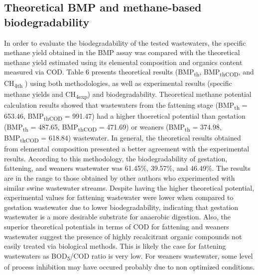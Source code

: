 \subsection{Theoretical BMP and methane-based biodegradability}
In order to evaluate the biodegradability of the tested wastewaters, the specific methane yield obtained in the BMP assay was compared with the theoretical methane yield estimated using its elemental composition and organics content measured via COD. Table 6 presents theoretical results (BMP\textsubscript{th}, BMP\textsubscript{thCOD}, and CH\textsubscript{4th} ) using both methodologies, as well as experimental results (specific methane yields and CH\textsubscript{4exp}) and  biodegradability.  Theoretical methane potential calculation results showed that wastewaters from the fattening stage (BMP\textsubscript{th} = 653.46, BMP\textsubscript{thCOD} = 991.47) had a higher thoeretical potential than gestation (BMP\textsubscript{th} = 487.65, BMP\textsubscript{thCOD} = 471.69) or weaners (BMP\textsubscript{th} = 374.98, BMP\textsubscript{thCOD} = 618.84) wastewater. In general, the theoretical results obtained from elemental composition presented a better agreement with the experimental results. According to this methodology, the biodegradability of gestation, fattening, and weaners wastewater was 61.45\%, 39.57\%, and 46.49\%. The results are in the range to those obtained by other authors \cite{Zhang_2014} who experimented with similar swine wastewater streams. Despite having the higher theoretical potential, experimental values for fattening wastewater were lower when compared to gestation wastewater due to lower biodegradability, indicating that gestation wastewater is a more desirable substrate for anaerobic digestion. Also, the superior theoretical potentials in terms of COD for fattening and weaners wastewater suggest the presence of highly recalcitrant organic compounds not easily treated via biological methods. This is likely the case for fattening wastewaters as BOD\textsubscript{5}/COD ratio is very low. For weaners wastewater, some level of process inhibition may have occured probably due to non optimized conditions. 